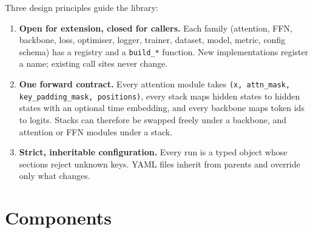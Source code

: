 \documentclass[11pt]{article}
\begin{document}
Three design principles guide the library:
\begin{enumerate}
  \item \textbf{Open for extension, closed for callers.} Each family (attention, FFN,
        backbone, loss, optimiser, logger, trainer, dataset, model, metric, config schema)
        has a registry and a \texttt{build\_*} function. New implementations register a
        name; existing call sites never change.
  \item \textbf{One forward contract.} Every attention module takes
        \texttt{(x, attn\_mask, key\_padding\_mask, positions)}, every stack maps hidden states
        to hidden states with an optional time embedding, and every backbone maps token ids
        to logits. Stacks can therefore be swapped freely under a backbone, and attention
        or FFN modules under a stack.
  \item \textbf{Strict, inheritable configuration.} Every run is a typed object whose sections
        reject unknown keys. YAML files inherit from parents and override only what
        changes.
\end{enumerate}

\section{Components}
\end{document}
